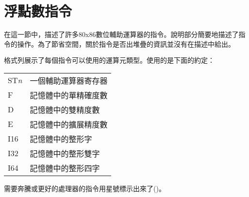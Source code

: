 \newpage
\section{浮點數指令}

\renewcommand{\thefootnote}{\fnsymbol{footnote}} 在這一節中，描述了許多80x86數位輔助運算器的指令。說明部分簡要地描述了指令的操作。為了節省空間，關於指令是否出堆疊的資訊並沒有在描述中給出。

格式列展示了每個指令可以使用的運算元類型。使用的是下面的約定：
\begin{center}
\begin{tabular}{|l|l|}
\hline
ST\emph{n} & 一個輔助運算器寄存器 \\
F          & 記憶體中的單精確度數 \\
D          & 記憶體中的雙精度數 \\
E          & 記憶體中的擴展精度數 \\
I16        & 記憶體中的整形字 \\
I32        & 記憶體中的整形雙字 \\
I64        & 記憶體中的整形四字 \\
\hline
\end{tabular}
\end{center}

需要奔騰或更好的處理器的指令用星號標示出來了(\footnotemark[1])。

